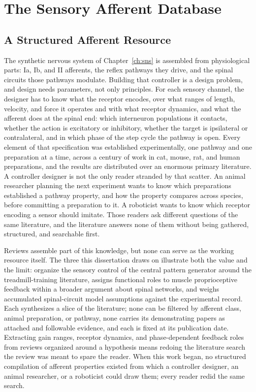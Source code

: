 ﻿\chapter{The Sensory Afferent Database}\label{ch:database}
\graphicspath{{../Figures/50-database/}{figs/50-database/}}

\section{A Structured Afferent Resource}\label{sec:sadb_resource}

The synthetic nervous system of Chapter~\ref{ch:sns} is assembled from physiological parts: Ia, Ib, and II afferents, the reflex pathways they drive, and the spinal circuits those pathways modulate. Building that controller is a design problem, and design needs parameters, not only principles. For each sensory channel, the designer has to know what the receptor encodes, over what ranges of length, velocity, and force it operates and with what receptor dynamics, and what the afferent does at the spinal end: which interneuron populations it contacts, whether the action is excitatory or inhibitory, whether the target is ipsilateral or contralateral, and in which phase of the step cycle the pathway is open. Every element of that specification was established experimentally, one pathway and one preparation at a time, across a century of work in cat, mouse, rat, and human preparations, and the results are distributed over an enormous primary literature. A controller designer is not the only reader stranded by that scatter. An animal researcher planning the next experiment wants to know which preparations established a pathway property, and how the property compares across species, before committing a preparation to it. A roboticist wants to know which receptor encoding a sensor should imitate. Those readers ask different questions of the same literature, and the literature answers none of them without being gathered, structured, and searchable first.

Reviews assemble part of this knowledge, but none can serve as the working resource itself. The three this dissertation draws on illustrate both the value and the limit: \citet{van_de_crommert_review_1998} organize the sensory control of the central pattern generator around the treadmill-training literature, \citet{windhorst_muscle_2007} assigns functional roles to muscle proprioceptive feedback within a broader argument about spinal networks, and \citet{windhorst_spinal_2022} weighs accumulated spinal-circuit model assumptions against the experimental record. Each synthesizes a slice of the literature; none can be filtered by afferent class, animal preparation, or pathway, none carries its demonstrating papers as attached and followable evidence, and each is fixed at its publication date. Extracting gain ranges, receptor dynamics, and phase-dependent feedback roles from reviews organized around a hypothesis means redoing the literature search the review was meant to spare the reader. When this work began, no structured compilation of afferent properties existed from which a controller designer, an animal researcher, or a roboticist could draw them; every reader redid the same search.

